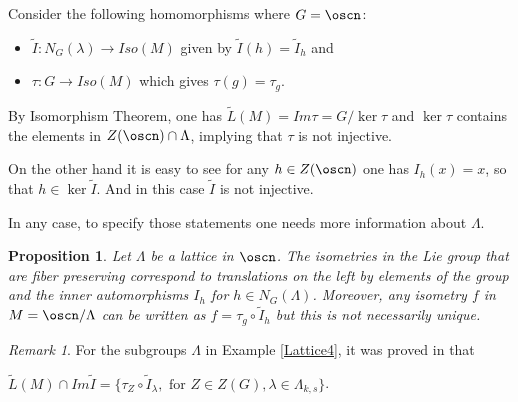 \documentclass[11pt]{amsart}
\theoremstyle{plain}
\newtheorem{prop}[thm]{Proposition}
\theoremstyle{definition}
\theoremstyle{remark}
\newtheorem{rem}{Remark}
\begin{document}
Consider the following homomorphisms where $G=\oscn$:
\begin{itemize}
	\item $\widetilde{I}:N_G(\lambda) \to Iso(M)$ given by $\widetilde{I}(h)=\widetilde{I}_h$ and
	\item $\tau: G \to Iso(M)$ which gives $\tau(g)=\tau_g$.
\end{itemize}

By Isomorphism Theorem, one has $\tilde{L}(M)=Im\tau=G/\ker\tau$ and $\ker\tau$ contains the elements in $Z(\oscn)\cap \Lambda$, implying that $\tau$ is not injective. 

On the other hand it is easy to see for any $h\in Z(\oscn)$ one has $I_h(x)=x$, so that $h\in \ker \widetilde{I}$. And in this case $\widetilde{I}$ is not injective. 

In any case, to specify those statements one needs more information about $\Lambda$. 


\begin{prop}
 Let $\Lambda$ be a lattice in $\oscn$. The isometries in the Lie group that are fiber preserving correspond to translations on the left by elements of the group and the inner automorphisms $I_h$ for $h\in N_G(\Lambda)$. Moreover, 
 any isometry $f$ in $M=\oscn/\Lambda$ can be written as $f=\tau_g\circ \widetilde{I}_h$ but this  is not necessarily unique. 
\end{prop}

\begin{rem} For the subgroups $\Lambda$ in Example \ref{Lattice4}, it was proved in \cite{BOV}  that 
	
	$\tilde{L}(M)\cap Im \tilde{I}=\{\tau_Z\circ\widetilde{I}_{\lambda}, \mbox{ for } Z\in Z(G), \lambda\in \Lambda_{k,s}\}$. 
	\end{rem}
	
\end{document}
